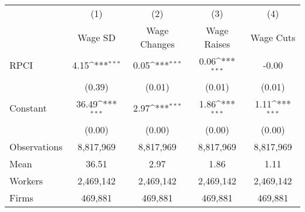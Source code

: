 {
\def\sym#1{\ifmmode^{#1}\else\(^{#1}\)\fi}
\begin{tabular}{l*{4}{c}}
\hline\hline
                    &\multicolumn{1}{c}{(1)}&\multicolumn{1}{c}{(2)}&\multicolumn{1}{c}{(3)}&\multicolumn{1}{c}{(4)}\\
                    &\multicolumn{1}{c}{Wage SD}&\multicolumn{1}{c}{Wage Changes}&\multicolumn{1}{c}{Wage Raises}&\multicolumn{1}{c}{Wage Cuts}\\
\hline
RPCI                &        4.15\sym{***}&        0.05\sym{***}&        0.06\sym{***}&       -0.00         \\
                    &      (0.39)         &      (0.01)         &      (0.01)         &      (0.01)         \\
[1em]
Constant            &       36.49\sym{***}&        2.97\sym{***}&        1.86\sym{***}&        1.11\sym{***}\\
                    &      (0.00)         &      (0.00)         &      (0.00)         &      (0.00)         \\
\hline
Observations        &   8,817,969         &   8,817,969         &   8,817,969         &   8,817,969         \\
Mean                &       36.51         &        2.97         &        1.86         &        1.11         \\
Workers             &   2,469,142         &   2,469,142         &   2,469,142         &   2,469,142         \\
Firms               &     469,881         &     469,881         &     469,881         &     469,881         \\
\hline\hline
\end{tabular}
}
